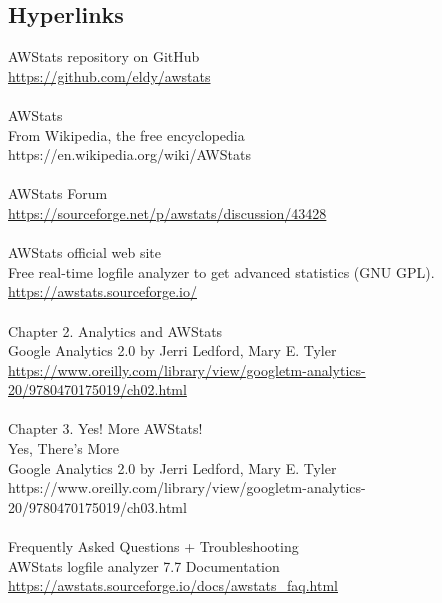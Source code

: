 
\subsection{Hyperlinks}

AWStats repository on GitHub\\
\href{https://github.com/eldy/awstats}{https://github.com/eldy/awstats}\\
\\
AWStats\\
From Wikipedia, the free encyclopedia\\
https://en.wikipedia.org/wiki/AWStats\\
\\
AWStats Forum\\
\href{https://sourceforge.net/p/awstats/discussion/43428}{https://sourceforge.net/p/awstats/discussion/43428}\\
\\
AWStats official web site\\
Free real-time logfile analyzer to get advanced statistics (GNU GPL).\\
\href{https://awstats.sourceforge.io/}{https://awstats.sourceforge.io/}\\
\\
Chapter 2. Analytics and AWStats\\
Google Analytics 2.0 by Jerri Ledford, Mary E. Tyler\\
\href{https://www.oreilly.com/library/view/googletm-analytics-20/9780470175019/ch02.html}{https://www.oreilly.com/library/view/googletm-analytics-20/9780470175019/ch02.html}\\
\\
Chapter 3. Yes! More AWStats!\\
Yes, There’s More\\
Google Analytics 2.0 by Jerri Ledford, Mary E. Tyler\\
https://www.oreilly.com/library/view/googletm-analytics-20/9780470175019/ch03.html\\
\\
Frequently Asked Questions + Troubleshooting\\
AWStats logfile analyzer 7.7 Documentation\\
\href{https://awstats.sourceforge.io/docs/awstats\_faq.html}{https://awstats.sourceforge.io/docs/awstats\_faq.html}
